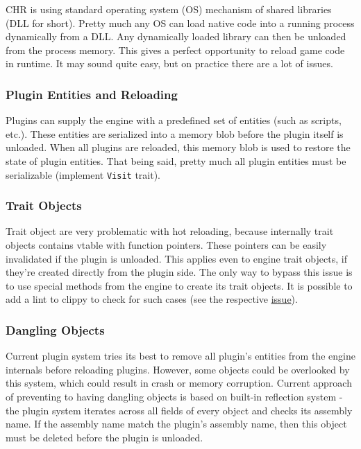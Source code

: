 \documentclass[
]{book}
\theoremstyle{definition}
\theoremstyle{definition}
\theoremstyle{definition}
\theoremstyle{definition}
\theoremstyle{remark}
\begin{document}
CHR is using standard operating system (OS) mechanism of shared libraries (DLL for short). Pretty much any OS can load native code into a running process dynamically from a DLL. Any dynamically loaded library can then be unloaded from the process memory. This gives a perfect opportunity to reload game code in runtime. It may sound quite easy, but on practice there are a lot of issues.

\subsubsection{Plugin Entities and Reloading}\label{plugin-entities-and-reloading}

Plugins can supply the engine with a predefined set of entities (such as scripts, etc.). These entities are serialized into a memory blob before the plugin itself is unloaded. When all plugins are reloaded, this memory blob is used to restore the state of plugin entities. That being said, pretty much all plugin entities must be serializable (implement \texttt{Visit} trait).

\subsubsection{Trait Objects}\label{trait-objects}

Trait object are very problematic with hot reloading, because internally trait objects contains vtable with function pointers. These pointers can be easily invalidated if the plugin is unloaded. This applies even to engine trait objects, if they're created directly from the plugin side. The only way to bypass this issue is to use special methods from the engine to create its trait objects. It is possible to add a lint to clippy to check for such cases (see the respective \href{https://github.com/rust-lang/rust-clippy/issues/12819}{issue}).

\subsubsection{Dangling Objects}\label{dangling-objects}

Current plugin system tries its best to remove all plugin's entities from the engine internals before reloading plugins. However, some objects could be overlooked by this system, which could result in crash or memory corruption. Current approach of preventing to having dangling objects is based on built-in reflection system - the plugin system iterates across all fields of every object and checks its assembly name. If the assembly name match the plugin's assembly name, then this object must be deleted before the plugin is unloaded.
\end{document}
